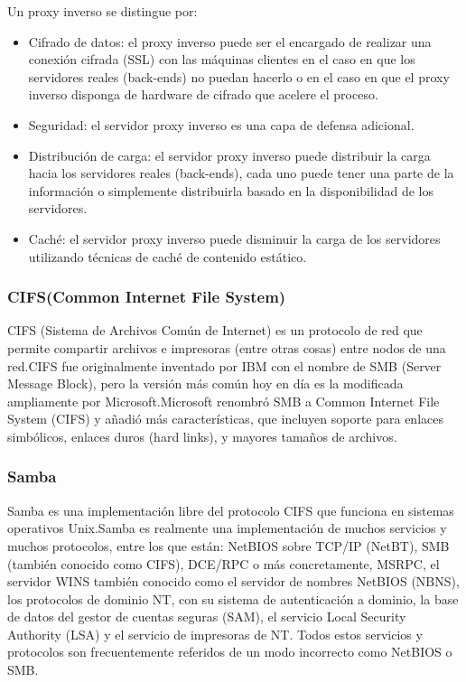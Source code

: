 Un proxy inverso se distingue por:

\begin{itemize}

	\item Cifrado de datos: el proxy inverso puede ser el encargado de realizar una conexión cifrada (SSL) con las máquinas clientes en el caso en que los servidores reales (back-ends) no puedan hacerlo o en el caso en que el proxy inverso disponga de hardware de cifrado que acelere el proceso.
	
	\item Seguridad: el servidor proxy inverso es una capa de defensa adicional.
	
	\item Distribución de carga: el servidor proxy inverso puede distribuir la carga hacia los servidores reales (back-ends), cada uno puede tener una parte de la información o simplemente distribuirla basado en la disponibilidad de los servidores.
	
	\item Caché: el servidor proxy inverso puede disminuir la carga de los servidores utilizando técnicas de caché de contenido estático.

\end{itemize}


\subsubsection*{CIFS(Common Internet File System)}

CIFS (Sistema de Archivos Común de Internet) es un protocolo de red que permite compartir archivos e impresoras (entre otras cosas) entre nodos de una red.\newline CIFS fue originalmente inventado por IBM con el nombre de SMB (Server Message Block), pero la versión más común hoy en día es la modificada ampliamente por Microsoft.\newline  Microsoft renombró SMB a Common Internet File System (CIFS) y añadió más características, que incluyen soporte para enlaces simbólicos, enlaces duros (hard links), y mayores tamaños de archivos.


\subsubsection*{Samba \cite{samba} }

Samba es una implementación libre del protocolo CIFS que funciona en sistemas operativos Unix.\newline Samba es realmente una implementación de muchos servicios y muchos protocolos, entre los que están: NetBIOS sobre TCP/IP (NetBT), SMB (también conocido como CIFS), DCE/RPC o más concretamente, MSRPC, el servidor WINS también conocido como el servidor de nombres NetBIOS (NBNS), los protocolos de dominio NT, con su sistema de autenticación a dominio, la base de datos del gestor de cuentas seguras (SAM), el servicio Local Security Authority (LSA) y el servicio de impresoras de NT. Todos estos servicios y protocolos son frecuentemente referidos de un modo incorrecto como NetBIOS o SMB.


